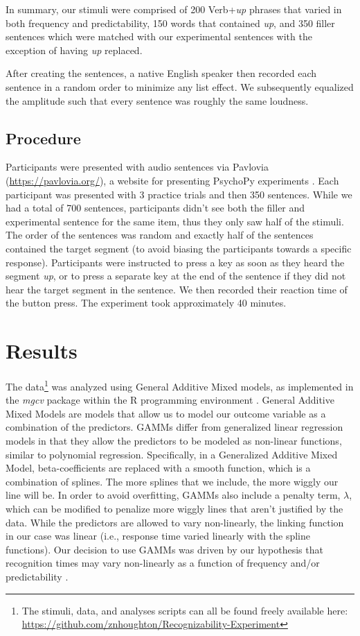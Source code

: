 \documentclass[
  authoryear,
  preprint,
  1p,
  onecolumn]{elsarticle}
\begin{document}
In summary, our stimuli were comprised of 200 Verb+\emph{up} phrases
that varied in both frequency and predictability, 150 words that
contained \emph{up}, and 350 filler sentences which were matched with
our experimental sentences with the exception of having \emph{up}
replaced.

After creating the sentences, a native English speaker then recorded
each sentence in a random order to minimize any list effect. We
subsequently equalized the amplitude such that every sentence was
roughly the same loudness.

\subsection{Procedure}\label{procedure}

Participants were presented with audio sentences via Pavlovia
(\url{https://pavlovia.org/}), a website for presenting PsychoPy
experiments \citep{peircePsychoPy2ExperimentsBehavior2019}. Each
participant was presented with 3 practice trials and then 350 sentences.
While we had a total of 700 sentences, participants didn't see both the
filler and experimental sentence for the same item, thus they only saw
half of the stimuli. The order of the sentences was random and exactly
half of the sentences contained the target segment (to avoid biasing the
participants towards a specific response). Participants were instructed
to press a key as soon as they heard the segment \emph{up}, or to press
a separate key at the end of the sentence if they did not hear the
target segment in the sentence. We then recorded their reaction time of
the button press. The experiment took approximately 40 minutes.

\section{Results}\label{results}

The data\footnote{The stimuli, data, and analyses scripts can all be
  found freely available here:
  \url{https://github.com/znhoughton/Recognizability-Experiment}} was
analyzed using General Additive Mixed models, as implemented in the
\emph{mgcv} package \citep{mgcv} within the R programming environment
\citep{Rpackage}. General Additive Mixed Models are models that allow us
to model our outcome variable as a combination of the predictors. GAMMs
differ from generalized linear regression models in that they allow the
predictors to be modeled as non-linear functions, similar to polynomial
regression. Specifically, in a Generalized Additive Mixed Model,
beta-coefficients are replaced with a smooth function, which is a
combination of splines. The more splines that we include, the more
wiggly our line will be. In order to avoid overfitting, GAMMs also
include a penalty term, \(\lambda\), which can be modified to penalize
more wiggly lines that aren't justified by the data. While the
predictors are allowed to vary non-linearly, the linking function in our
case was linear (i.e., response time varied linearly with the spline
functions). Our decision to use GAMMs was driven by our hypothesis that
recognition times may vary non-linearly as a function of frequency
and/or predictability \citep[as suggested by][]{kapatsinski2009}.
\end{document}
